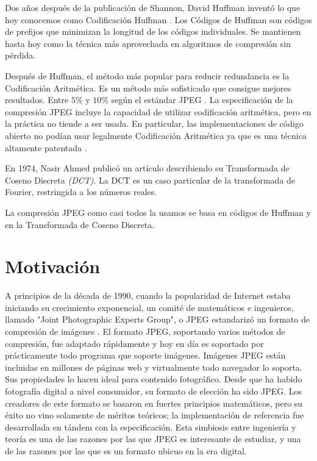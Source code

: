 Dos años después de la publicación de Shannon, David Huffman inventó lo que hoy conocemos como Codificación Huffman \citep{Huffman}. Los Códigos de Huffman son códigos de prefijos que minimizan la longitud de los códigos individuales. Se mantienen hasta hoy como la técnica más aprovechada en algoritmos de compresión sin pérdida.

Después de Huffman, el método más popular para reducir redundancia es la Codificación Aritmética. Es un método más sofisticado que consigue mejores resultados. Entre $5\%$ y $10\%$ según el estándar JPEG \citep{JPEGSTD}. La especificación de la compresión JPEG incluye la capacidad de utilizar codificación aritmética, pero en la práctica no tiende a ser usada. En particular, las implementaciones de código abierto no podían usar legalmente Codificación Aritmética ya que es una técnica altamente patentada \citep{jpeg_patents}.

En 1974, Nasir Ahmed publicó un artículo describiendo su Transformada de Coseno Discreta \emph{(DCT)}. La DCT es un caso particular de la transformada de Fourier, restringida a los números reales.

La compresión JPEG como casi todos la usamos se basa en códigos de Huffman y en la Transformada de Coseno Discreta.

\section{Motivación}

A principios de la década de 1990, cuando la popularidad de Internet estaba iniciando su crecimiento exponencial, un comité de matemáticos e ingenieros, llamado "Joint Photographic Experts Group", o JPEG estandarizó un formato de compresión de imágenes \citep{JPEGSTD}. El formato JPEG, soportando varios métodos de compresión, fue adaptado rápidamente y hoy en día es soportado por prácticamente todo programa que soporte imágenes. Imágenes JPEG están incluidas en millones de páginas web y virtualmente todo navegador lo soporta. Sus propiedades lo hacen ideal para contenido fotográfico. Desde que ha habido fotografía digital a nivel consumidor, su formato de elección ha sido JPEG. Los creadores de este formato se basaron en fuertes principios matemáticos, pero su éxito no vino solamente de méritos teóricos; la implementación de referencia fue desarrollada en tándem con la especificación. Esta simbiosis entre ingeniería y teoría es una de las razones por las que JPEG es interesante de estudiar, y una de las razones por las que es un formato ubicuo en la era digital.

